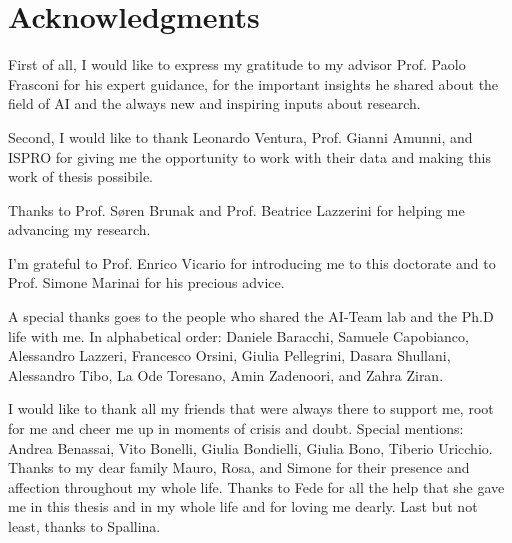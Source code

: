 \section*{Acknowledgments}
First of all, I would like to express my gratitude to my advisor
Prof. Paolo Frasconi for his expert guidance, for the important
insights he shared about the field of AI and the always new and
inspiring inputs about research.

Second, I would like to thank Leonardo Ventura, Prof. Gianni Amunni,
and ISPRO for giving me the opportunity to work with their data and
making this work of thesis possibile.

Thanks to Prof. S{\o}ren Brunak and Prof. Beatrice Lazzerini for
helping me advancing my 
research. 

I’m grateful to Prof. Enrico Vicario for introducing me to this
doctorate and to Prof. Simone Marinai for his precious advice.

A special thanks goes to the people who shared the AI-Team lab and the
Ph.D life with me. In alphabetical order: Daniele Baracchi, Samuele
Capobianco, Alessandro Lazzeri, Francesco Orsini, Giulia Pellegrini,
Dasara Shullani,
Alessandro Tibo, La Ode Toresano, Amin Zadenoori, and Zahra Ziran.

I would like to thank all my friends that were always there to support
me, root for me and cheer me up in moments of crisis and
doubt. Special mentions: Andrea Benassai, Vito Bonelli, Giulia
Bondielli, Giulia Bono, Tiberio Uricchio. Thanks to my dear family
Mauro, Rosa, and Simone for their presence and affection throughout my
whole life. Thanks to Fede for all the help that she gave me in this
thesis and in my whole life and for loving me dearly. Last but not
least, thanks to Spallina.

